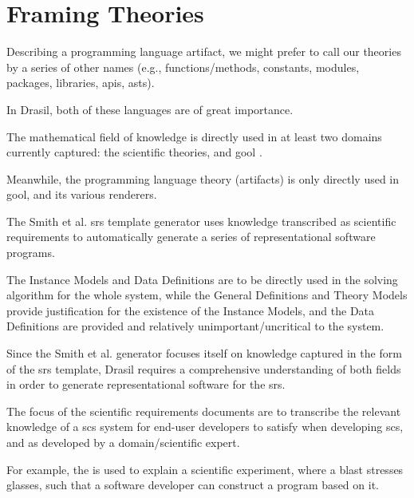 
\chapter{Framing Theories}
\label{chap:modelkinds}

Describing a programming language artifact, we might prefer to call our theories
by a series of other names (e.g., functions/methods, constants, modules,
packages, libraries, \acsp{api}, \acsp{ast}).





In Drasil, both of these languages are of great importance.

The mathematical field of knowledge is directly used in at least two domains
currently captured: the scientific theories, and \acs{gool} \cite{Carette2019}.

Meanwhile, the programming language theory (artifacts) is only directly used in
\acs{gool}, and its various renderers.

The Smith et al. \acs{srs} \cite{SmithAndLai2005} template generator uses
knowledge transcribed as scientific requirements to automatically generate a
series of representational software programs.




The Instance Models and Data Definitions are to be directly used in the solving
algorithm for the whole system, while the General Definitions and Theory Models
provide justification for the existence of the Instance Models, and the Data
Definitions are provided and relatively unimportant/uncritical to the system.




Since the Smith et al. generator focuses itself on knowledge captured in the
form of the \acs{srs} template, Drasil requires a comprehensive understanding of
both fields in order to generate representational software for the \acs{srs}.

The focus of the scientific requirements documents are to transcribe the
relevant knowledge of a \acs{scs} system for end-user developers to satisfy when
developing \acs{scs}, and as developed by a domain/scientific expert.

For example, the 
is used to explain a scientific experiment, where a blast stresses glasses, such
that a software developer can construct a program based on it.

